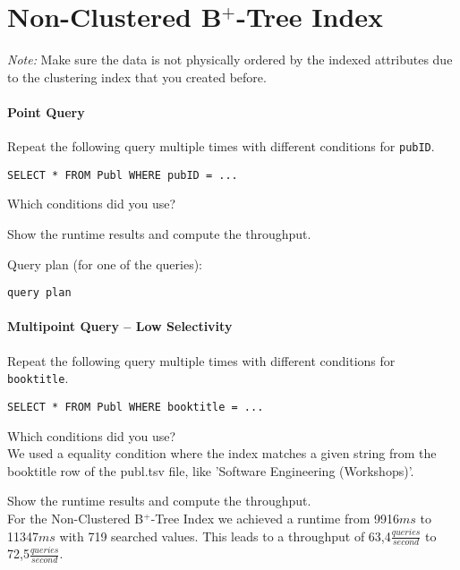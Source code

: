 \documentclass[11pt]{scrartcl}
\begin{document}
\section{Non-Clustered B$^+$-Tree Index}

\noindent \emph{Note:} Make sure the data is not physically ordered by
the indexed attributes due to the clustering index that you created
before.

\paragraph{Point Query}

Repeat the following query multiple times with different conditions for {\tt pubID}.

{\small
\begin{verbatim}
SELECT * FROM Publ WHERE pubID = ...
\end{verbatim}
}

\noindent
Which conditions did you use?

\smallskip\noindent
Show the runtime results and compute the throughput.

\smallskip\noindent
Query plan (for one of the queries):
{\small
\begin{verbatim}
query plan
\end{verbatim}
}


\paragraph{Multipoint Query -- Low Selectivity}

Repeat the following query multiple times with different conditions for {\tt booktitle}.

{\small
\begin{verbatim}
SELECT * FROM Publ WHERE booktitle = ...
\end{verbatim}
}

\noindent
Which conditions did you use?\\
We used a equality condition where the index matches a given string from the booktitle row of the publ.tsv file, like 'Software Engineering (Workshops)'.

\smallskip\noindent
Show the runtime results and compute the throughput.\\
For the Non-Clustered B$^+$-Tree Index we achieved a runtime from 9916$ms$ to 11347$ms$ with 719 searched values.
This leads to a throughput of 63,4$\frac{queries}{second}$ to 72,5$\frac{queries}{second}$.\\
\end{document}
